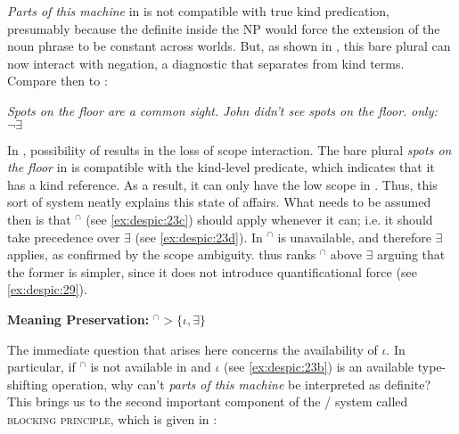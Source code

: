 \documentclass[output=paper,
modfonts
]{langscibook}
\begin{document}
	\ea \label{ex:despic:27}
	\z 
	\sn\citep[419]{Dayal2004}
	\z 
	
	\textit{Parts of this machine} in  is not compatible with true kind predication, presumably because the definite inside the NP would force the extension of the noun phrase to be constant across worlds. But, as shown in , this bare plural can now interact with negation, a diagnostic that separates  from kind terms. Compare then  to :
	
	\ea \label{ex:despic:28} 
	\ea \label{ex:despic:28a} 
	\textit{Spots on the floor are a common sight.}
	\ex \label{ex:despic:28b} 
	\textit{John didn't see spots on the floor.} \hfill\textit{only:} $\neg\exists$\hspace{75pt}
	\z 
	\z 
	
	In , possibility of  results in the loss of scope interaction. The bare plural \textit{spots on the floor} in  is compatible with the kind-level predicate, which indicates that it has a kind reference. As a result, it can only have the low scope in . Thus, this sort of
	system neatly explains this state of affairs. What needs to be assumed then is that $^\cap$ (see \ref{ex:despic:23c}) should apply whenever it can; i.e. it should take precedence over $\exists$ (see \ref{ex:despic:23d}). In  $^\cap$ is unavailable, and therefore $\exists$ applies, as confirmed by the scope ambiguity. \citet{Chierchia1998} thus ranks $^\cap$ above $\exists$ arguing that the former is simpler, since it does not introduce quantificational force (see \ref{ex:despic:29}).
	
	\ea \label{ex:despic:29}
	\textbf{Meaning Preservation:} \hspace{25pt}$^\cap>\{\iota,\exists\}$ \citep[419]{Dayal2004}
	\z 
	
	The immediate question that arises here concerns the availability of $\iota$. In particular, if $^\cap$ is not available in  and $\iota$ (see \ref{ex:despic:23b}) is an available type-shifting operation, why can't \textit{parts of this machine} be interpreted as definite? This brings us to the second important component of the \citet{Chierchia1998}/\citet{Dayal2004} system called \textsc{blocking principle}, which is given in : 
	
\end{document}
